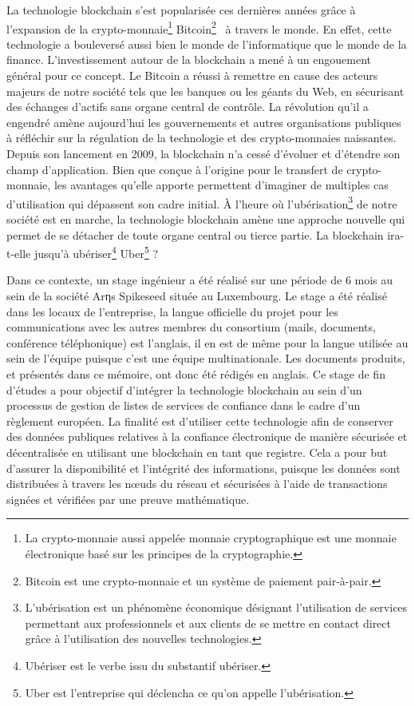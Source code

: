 \documentclass{tnreport}
\begin{document}
La technologie blockchain s'est popularisée ces dernières années grâce à l'expansion de la crypto-monnaie\footnote{La crypto-monnaie aussi appelée monnaie cryptographique est une monnaie électronique basé sur les principes de la cryptographie.} Bitcoin\footnote{Bitcoin est une crypto-monnaie et un système de paiement pair-à-pair.}~\cite{Bitcoin} à travers le monde. 
En effet, cette technologie a bouleversé aussi bien le monde de l'informatique que le monde de la finance. 
L'investissement autour de la blockchain a mené à un engouement général pour ce concept. 
Le Bitcoin a réussi à remettre en cause des acteurs majeurs de notre société tels que les banques ou les géants du Web, en sécurisant des échanges d'actifs sans organe central de contrôle. 
La révolution qu'il a engendré amène aujourd'hui les gouvernements et autres organisations publiques à réfléchir sur la régulation de la technologie et des crypto-monnaies naissantes.
Depuis son lancement en 2009, la blockchain n'a cessé d'évoluer et d'étendre son champ d'application.
Bien que conçue à l'origine pour le transfert de crypto-monnaie, les avantages qu'elle apporte permettent d'imaginer de multiples cas d'utilisation qui dépassent son cadre initial.
À l'heure où l'ubérisation\footnote{L'ubérisation est un phénomène économique désignant l'utilisation de services permettant aux professionnels et aux clients de se mettre en contact direct grâce à l'utilisation des nouvelles technologies.} de notre société est en marche, la technologie blockchain amène une approche nouvelle qui permet de se détacher de toute organe central ou tierce partie. 
La blockchain ira-t-elle jusqu'à ubériser\footnote{Ubériser est le verbe issu du substantif ubériser.} Uber\footnote{Uber est l'entreprise qui déclencha ce qu'on appelle l'ubérisation.} ?


Dans ce contexte, un stage ingénieur a été réalisé sur une période de 6 mois au sein de la société Arηs Spikeseed située au Luxembourg. 
Le stage a été réalisé dans les locaux de l'entreprise, la langue officielle du projet pour les communications avec les autres membres du consortium (mails, documents, conférence téléphonique) est l’anglais, il en est de même pour la langue utilisée au sein de l'équipe puisque c'est une équipe multinationale. Les documents produits, et présentés dans ce mémoire, ont donc été rédigés en anglais.
Ce stage de fin d'études a pour objectif d'intégrer la technologie blockchain au sein d'un processus de gestion de listes de services de confiance dans le cadre d'un règlement européen. 
La finalité est d'utiliser cette technologie afin de conserver des données publiques relatives à la confiance électronique de manière sécurisée et décentralisée en utilisant une blockchain en tant que registre.
Cela a pour but d'assurer la disponibilité et l'intégrité des informations, puisque les données sont distribuées à travers les nœuds du réseau et sécurisées à l'aide de transactions signées et vérifiées par une preuve mathématique. 
\end{document}
